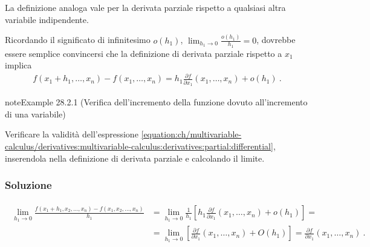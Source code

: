 \documentclass[letterpaper,10pt,italian]{jupyterBook}
\begin{document}
\sphinxAtStartPar
La definizione analoga vale per la derivata parziale rispetto a qualsiasi altra variabile indipendente.

\sphinxAtStartPar
Ricordando il significato di infinitesimo \(o(h_1)\), \(\lim_{h_1 \rightarrow 0} \frac{o(h_1)}{h_1} = 0\), dovrebbe essere semplice convincersi che la definizione di derivata parziale rispetto a \(x_1\) implica
\begin{equation}\label{equation:ch/multivariable-calculus/derivatives:multivariable-calculus:derivatives:partial:differential}
\begin{split}
  f(x_1+h_1, \dots, x_n) - f(x_1, \dots, x_n) = h_1 \frac{\partial f}{\partial x_1}(x_1, \dots, x_n) + o(h_1) \ .
\end{split}
\end{equation}\label{ch/multivariable-calculus/derivatives:multivariable-calculus:increment-1}
\begin{sphinxadmonition}{note}{Example 28.2.1 (Verifica dell’incremento della funzione dovuto all’incremento di una variabile)}



\sphinxAtStartPar
Verificare la validità dell’espressione \eqref{equation:ch/multivariable-calculus/derivatives:multivariable-calculus:derivatives:partial:differential}, inserendola nella definizione di derivata parziale e calcolando il limite.
\subsubsection*{Soluzione}
\begin{equation*}
\begin{split}\begin{aligned}
  \lim_{h_1 \rightarrow 0} \frac{f(x_1+h_1, x_2, \dots, x_n) - f(x_1, x_2, \dots, x_n)}{h_1} & = 
  \lim_{h_1 \rightarrow 0} \frac{1}{h_1} \left[ h_1 \frac{\partial f}{\partial x_1}(x_1, \dots, x_n) + o(h_1) \right] = \\
  & = \lim_{h_1 \rightarrow 0} \left[ \frac{\partial f}{\partial x_1}(x_1, \dots, x_n) + O(h_1) \right] = \frac{\partial f}{\partial x_1}(x_1, \dots, x_n) \ .
\end{aligned}\end{split}
\end{equation*}\end{sphinxadmonition}
\end{document}
